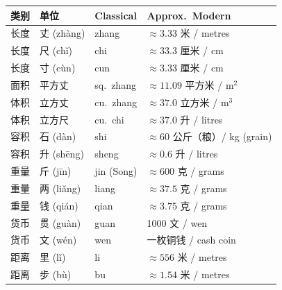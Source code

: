\documentclass[11pt,a4paper]{article}
\begin{document}
\vspace{0.5em}
\begin{center}
\begin{longtable}{llll}
\toprule
\textbf{类别} & \textbf{单位} & \textbf{Classical} & \textbf{Approx.~Modern} \\
\midrule
\endfirsthead
长度 & 丈 (zh\`ang) & zhang & $\approx 3.33$ 米 / metres \\
长度 & 尺 (ch\v{i}) & chi & $\approx 33.3$ 厘米 / cm \\
长度 & 寸 (c\`un) & cun & $\approx 3.33$ 厘米 / cm \\
面积 & 平方丈 & sq.~zhang & $\approx 11.09$ 平方米 / m$^2$ \\
体积 & 立方丈 & cu.~zhang & $\approx 37.0$ 立方米 / m$^3$ \\
体积 & 立方尺 & cu.~chi & $\approx 37.0$ 升 / litres \\
容积 & 石 (d\`an) & shi & $\approx 60$ 公斤（粮）/ kg (grain) \\
容积 & 升 (sh\=eng) & sheng & $\approx 0.6$ 升 / litres \\
重量 & 斤 (j\=in) & jin (Song) & $\approx 600$ 克 / grams \\
重量 & 两 (li\v{a}ng) & liang & $\approx 37.5$ 克 / grams \\
重量 & 钱 (qi\'an) & qian & $\approx 3.75$ 克 / grams \\
货币 & 贯 (gu\`an) & guan & 1000 文 / wen \\
货币 & 文 (w\'en) & wen & 一枚铜钱 / cash coin \\
距离 & 里 (l\v{i}) & li & $\approx 556$ 米 / metres \\
距离 & 步 (b\`u) & bu & $\approx 1.54$ 米 / metres \\
\bottomrule
\end{longtable}
\end{center}
\end{document}
